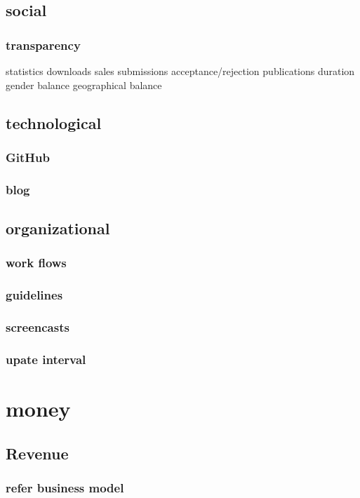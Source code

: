 \documentclass[output=guidelines,guidelines] {langscibook}
\begin{document}
\subsection{social}
\subsubsection{transparency}
                    statistics
                        downloads
                        sales
                        submissions
                        acceptance/rejection
                        publications
                        duration
                        gender balance
                        geographical balance
\subsection{technological}
\subsubsection{GitHub}
\subsubsection{blog}
\subsection{organizational}
\subsubsection{work flows}
\subsubsection{guidelines}
\subsubsection{screencasts}
\subsubsection{upate interval}
\section{money}
\subsection{Revenue}
\subsubsection{refer business model}
\end{document}
